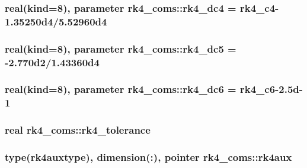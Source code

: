 \subsubsection[{\texorpdfstring{rk4\+\_\+dc4}{rk4_dc4}}]{\setlength{\rightskip}{0pt plus 5cm}real(kind=8), parameter rk4\+\_\+coms\+::rk4\+\_\+dc4 = {\bf rk4\+\_\+c4}-\/1.\+35250d4/5.\+52960d4}\hypertarget{namespacerk4__coms_a1bb5b9bcaddfd294bf37a8ea838adf3f}{}\label{namespacerk4__coms_a1bb5b9bcaddfd294bf37a8ea838adf3f}
\subsubsection[{\texorpdfstring{rk4\+\_\+dc5}{rk4_dc5}}]{\setlength{\rightskip}{0pt plus 5cm}real(kind=8), parameter rk4\+\_\+coms\+::rk4\+\_\+dc5 = -\/2.\+770d2/1.\+43360d4}\hypertarget{namespacerk4__coms_aa2ab2d5fa0e976ca56e10da08c4409a6}{}\label{namespacerk4__coms_aa2ab2d5fa0e976ca56e10da08c4409a6}
\subsubsection[{\texorpdfstring{rk4\+\_\+dc6}{rk4_dc6}}]{\setlength{\rightskip}{0pt plus 5cm}real(kind=8), parameter rk4\+\_\+coms\+::rk4\+\_\+dc6 = {\bf rk4\+\_\+c6}-\/2.\+5d-\/1}\hypertarget{namespacerk4__coms_abf3a30685db4e4c9f6cd9f903eb1a2fd}{}\label{namespacerk4__coms_abf3a30685db4e4c9f6cd9f903eb1a2fd}
\subsubsection[{\texorpdfstring{rk4\+\_\+tolerance}{rk4_tolerance}}]{\setlength{\rightskip}{0pt plus 5cm}real rk4\+\_\+coms\+::rk4\+\_\+tolerance}\hypertarget{namespacerk4__coms_ab839ff31cd3abc7dd1fd40e4d3983a31}{}\label{namespacerk4__coms_ab839ff31cd3abc7dd1fd40e4d3983a31}
\subsubsection[{\texorpdfstring{rk4aux}{rk4aux}}]{\setlength{\rightskip}{0pt plus 5cm}type({\bf rk4auxtype}), dimension(\+:), pointer rk4\+\_\+coms\+::rk4aux}\hypertarget{namespacerk4__coms_af06182f853d5a71c46e249e55fe5a678}{}\label{namespacerk4__coms_af06182f853d5a71c46e249e55fe5a678}

